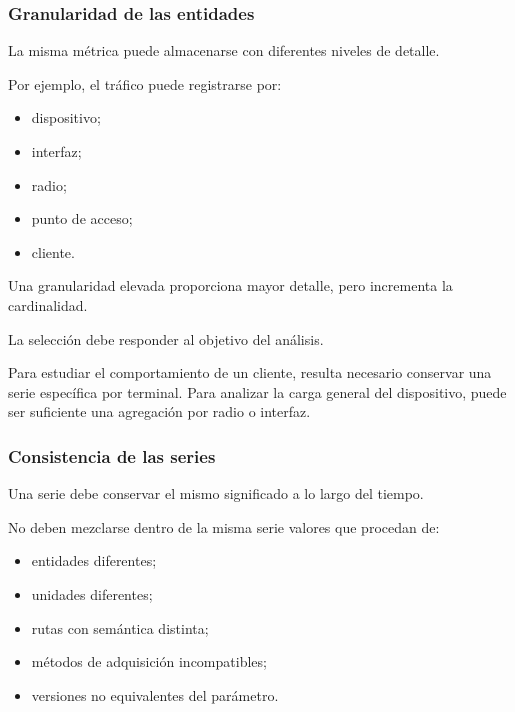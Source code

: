 \subsubsection*{Granularidad de las entidades}

La misma métrica puede almacenarse con diferentes niveles de detalle.

Por ejemplo, el tráfico puede registrarse por:

\begin{itemize}
    \item dispositivo;

    \item interfaz;

    \item radio;

    \item punto de acceso;

    \item cliente.
\end{itemize}

Una granularidad elevada proporciona mayor detalle, pero incrementa la
cardinalidad.

La selección debe responder al objetivo del análisis.

Para estudiar el comportamiento de un cliente, resulta necesario
conservar una serie específica por terminal. Para analizar la carga
general del dispositivo, puede ser suficiente una agregación por radio o
interfaz.


\subsubsection*{Consistencia de las series}

Una serie debe conservar el mismo significado a lo largo del tiempo.

No deben mezclarse dentro de la misma serie valores que procedan de:

\begin{itemize}
    \item entidades diferentes;

    \item unidades diferentes;

    \item rutas con semántica distinta;

    \item métodos de adquisición incompatibles;

    \item versiones no equivalentes del parámetro.
\end{itemize}

